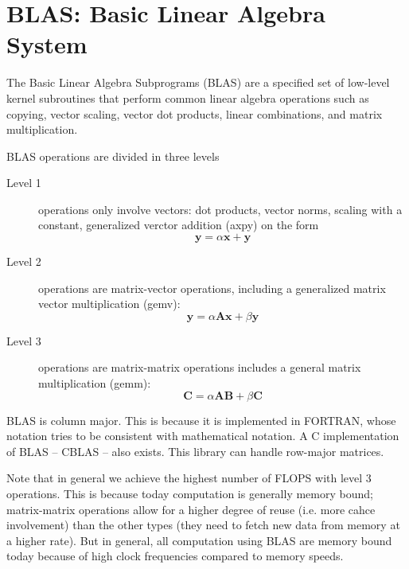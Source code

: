 
\section{BLAS: Basic Linear Algebra System} %
\label{sec:blas}

The Basic Linear Algebra Subprograms (BLAS) are a specified set of low-level kernel subroutines that perform common linear algebra operations such as copying, vector scaling, vector dot products, linear combinations, and matrix multiplication.

BLAS operations are divided in three levels
\begin{description}
  \item[Level 1] operations only involve vectors: dot products, vector norms, scaling with a constant, generalized verctor addition (axpy) on the form
    \[
      \mathbf{y} = \alpha \mathbf{x} + \mathbf{y}
    \]
  \item[Level 2] operations are matrix-vector operations, including a generalized matrix vector multiplication (gemv):
    \[
      \mathbf{y} = \alpha \mathbf{A}\mathbf{x} + \beta \mathbf{y}
    \]
  \item[Level 3] operations are matrix-matrix operations includes a general matrix multiplication (gemm):
    \[
      \mathbf{C} = \alpha \mathbf{AB} + \beta \mathbf{C}
    \]
\end{description}

BLAS is column major. This is because it is implemented in FORTRAN, whose notation tries to be consistent with mathematical notation. A C implementation of BLAS -- CBLAS -- also exists. This library can handle row-major matrices.

Note that in general we achieve the highest number of FLOPS with level 3 operations. This is because today computation is generally memory bound; matrix-matrix operations allow for a higher degree of reuse (i.e. more cahce involvement) than the other types (they need to fetch new data from memory at a higher rate). But in general, all computation using BLAS are memory bound today because of high clock frequencies compared to memory speeds.




